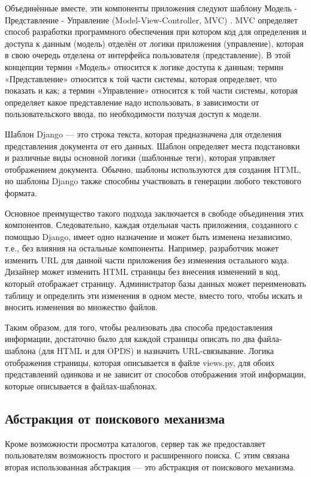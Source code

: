  Объединённые вместе, эти компоненты приложения следуют шаблону Модель - Представление - Управление  (Model-View-Controller, MVC) \cite{mvc}. MVC определяет способ разработки программного обеспечения при котором код для определения и доступа к данным (модель) отделён от логики приложения (управление), которая в свою очередь отделена от интерфейса пользователя (представление). В этой концепции термин «Модель» относится к логике доступа к данным; термин «Представление» относится к той части системы, которая определяет, что показать и как; а термин «Управление» относится к той части системы, которая определяет какое представление надо использовать, в зависимости от пользовательского ввода, по необходимости получая доступ к модели. 

Шаблон Django — это строка текста, которая предназначена для отделения представления документа от его данных. Шаблон определяет места подстановки и различные виды основной логики (шаблонные теги), которая управляет отображением документа. Обычно, шаблоны используются для создания HTML, но шаблоны Django также способны участвовать в генерации любого текстового формата.

Основное преимущество такого подхода заключается в свободе объединения этих компонентов. Следовательно, каждая отдельная часть приложения, созданного с помощью Django, имеет одно назначение и может быть изменена независимо, т.е., без влияния на остальные компоненты. Например, разработчик может изменить URL для данной части приложения без изменения остального кода. Дизайнер может изменить HTML страницы без внесения изменений в код, который отображает страницу. Администратор базы данных может переименовать таблицу и определить эти изменения в одном месте, вместо того, чтобы искать и вносить изменения во множество файлов.

Таким образом, для того, чтобы реализовать два способа предоставления информации, достаточно было для каждой страницы описать по два файла-шаблона (для HTML и для OPDS) и назначить URL-связыва\-ние. Логика отображения страницы, которая описывается в файле views.py, для обоих представлений одинкова и не зависит от способов отображения этой информации, которые описывается в файлах-шаблонах.

\subsection{Абстракция от поискового механизма}

Кроме возможности просмотра каталогов, сервер так же предоставляет пользователям возможность простого и расширенного поиска. С этим связана вторая использованная абстракция --- это абстракция от поискового механизма. 


